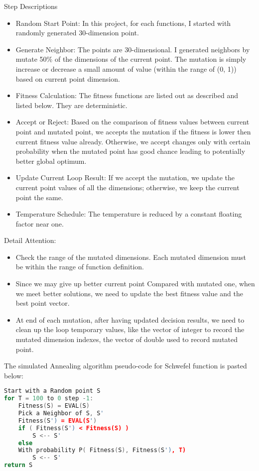 \documentclass{article}
\begin{document}
\begin{CJK}{UTF8}{gbsn}
\begin{description}
\item Step Descriptions
  \begin{itemize}
    \itemsep=-3pt
  \item Random Start Point: In this project, for each functions, I started with randomly generated 30-dimension point. 
  \item Generate Neighbor: The points are 30-dimensional. I generated neighbors by mutate 50\% of the dimensions of the current point. The mutation is simply increase or decrease a small amount of value (within the range of (0, 1)) based on current point dimension. 
  \item Fitness Calculation: The fitness functions are listed out as described and listed below. They are deterministic. 
  \item Accept or Reject: Based on the comparison of fitness values between current point and mutated point, we accepts the mutation if the fitness is lower then current fitness value already. Otherwise, we accept changes only with certain probability when the mutated point has good chance leading to potentially better global optimum.
  \item Update Current Loop Result: If we accept the mutation, we update the current point values of all the dimensions; otherwise, we keep the current point the same.
  \item Temperature Schedule: The temperature is reduced by a constant floating factor near one. 
  \end{itemize}

\item Detail Attention: 
  \begin{itemize}
    \itemsep=-3pt
  \item Check the range of the mutated dimensions. Each mutated dimension must be within the range of function definition. 
  \item Since we may give up better current point Compared with mutated one, when we meet better solutions, we need to update the best fitness value and the best point vector. 
  \item At end of each mutation, after having updated decision results, we need to clean up the loop temporary values, like the vector of integer to record the mutated dimension indexes, the vector of double used to record mutated point. 
  \end{itemize}
\end{description}

The simulated Annealing algorithm pseudo-code for Schwefel function is pasted below: 
\begin{lstlisting}[language=c++]
Start with a Random point S
for T = 100 to 0 step -1:
    Fitness(S) = EVAL(S)
    Pick a Neighbor of S, S'
    Fitness(S') = EVAL(S')
    if ( Fitness(S') < Fitness(S) )
        S <-- S'
    else
    With probability P( Fitness(S), Fitness(S'), T)
        S <-- S'
return S
\end{lstlisting}



\end{CJK}
\end{document}
